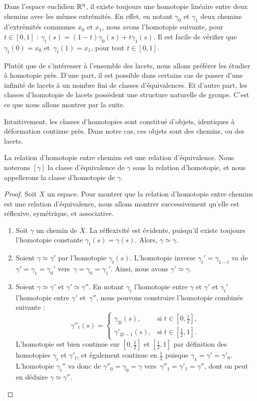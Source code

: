 \begin{exemple}
Dans l'espace euclidien $\mathbb{R}^n$, il existe toujours une homotopie linéaire entre deux chemins avec les mêmes extrémités. En effet, en notant $\gamma_0$ et $\gamma_1$ deux chemins d'extrémités communes $x_0$ et $x_1$, nous avons l'homotopie suivante, pour~$t\in[0,1]$ :  $\gamma_t(s)=(1-t)\gamma_0(s)+t\gamma_1(s)$. Il est facile de vérifier que $\gamma_t(0)=x_0$ et~$\gamma_t(1)=x_1$, pour tout $t\in[0,1]$.
\end{exemple}

Plutôt que de s'intéresser à l'ensemble des lacets, nous allons préférer les étudier à homotopie près. D'une part, il est possible dans certains cas de passer d'une infinité de lacets à un nombre fini de classes d'équivalences. Et d'autre part, les classes d'homotopie de lacets possèdent une structure naturelle de groupe. C'est ce que nous allons montrer par la suite.

Intuitivement, les classes d'homotopies sont constitué d'objets, identiques à déformation continue près. Dans notre cas, ces objets sont des chemins, ou des lacets.

\begin{proposition}
La relation d'homotopie entre chemins est une relation d'équivalence. Nous noterons $[\gamma]$ la classe d'équivalence de $\gamma$ sous la relation d'homotopie, et nous appellerons la classe d'homotopie de $\gamma$.
\end{proposition}
\begin{proof}
Soit $X$ un espace. Pour montrer que la relation d'homotopie entre chemins est une relation d'équivalence, nous allons montrer successivement qu'elle est réflexive, symétrique, et associative.\begin{enumerate}
    \item Soit $\gamma$ un chemin de $X$. La réflexivité est évidente, puisqu'il existe toujours l'homotopie constante $\gamma_t(s)=\gamma(s)$. Alors, $\gamma\simeq\gamma$.
    \item Soient $\gamma\simeq\gamma'$ par l'homotopie $\gamma_t(s)$. L'homotopie inverse $\gamma_t'=\gamma_{1-t}$ va de $\gamma'=\gamma_1=\gamma_0'$ vers~$\gamma=\gamma_0=\gamma_1'$. Ainsi, nous avons $\gamma'\simeq\gamma$.
    \item Soient $\gamma\simeq\gamma'$ et $\gamma'\simeq\gamma''$. En notant $\gamma_t$ l'homotopie entre $\gamma$ et $\gamma'$ et $\gamma_t'$ l'homotopie entre $\gamma'$ et~$\gamma''$, nous pouvons construire l'homotopie combinée suivante : \[\gamma''_t(s)= \left\{\begin{matrix}
\gamma_{2t}(s),&\text{si }t\in[0,\frac{1}{2}], \\
\gamma'_{2t-1}(s),&\text{si }t\in[\frac{1}{2},1].
\end{matrix}\right.\]L'homotopie est bien continue sur $[0,\frac{1}{2}]$ et $[\frac{1}{2},1]$ par définition des homotopies $\gamma_t$ et $\gamma'_t$, et également continue en $\frac{1}{2}$ puisque $\gamma_1=\gamma'=\gamma'_0$. L'homotopie $\gamma_t''$ va donc de $\gamma''_0=\gamma_0=\gamma$ vers~$\gamma''_1=\gamma'_1=\gamma''$, dont on peut en déduire $\gamma\simeq\gamma''$.
\end{enumerate}
\end{proof}

